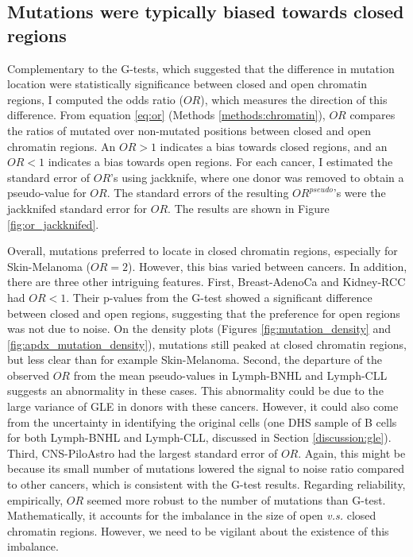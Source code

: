

\subsection{Mutations were typically biased towards closed regions}\label{gle:or}
Complementary to the G-tests, which suggested that the difference in mutation location were statistically significance between closed and open chromatin regions, I computed the odds ratio ($OR$), which measures the direction of this difference. From equation \ref{eq:or} (Methods \ref{methods:chromatin}), $OR$ compares the ratios of mutated over non-mutated positions between closed and open chromatin regions. An $OR>1$ indicates a bias towards closed regions, and an $OR<1$ indicates a bias towards open regions. For each cancer, I estimated the standard error of $OR$'s using jackknife, where one donor was removed to obtain a pseudo-value for $OR$. The standard errors of the resulting $OR^{pseudo}$'s were the jackknifed standard error for $OR$. The results are shown in Figure \ref{fig:or_jackknifed}.



Overall, mutations preferred to locate in closed chromatin regions, especially for Skin-Melanoma ($OR=2$). However, this bias varied between cancers. In addition, there are three other intriguing features. First, Breast-AdenoCa and Kidney-RCC had $OR<1$. Their p-values from the G-test showed a significant difference between closed and open regions, suggesting that the preference for open regions was not due to noise. On the density plots (Figures \ref{fig:mutation_density} and \ref{fig:apdx_mutation_density}), mutations still peaked at closed chromatin regions, but less clear than for example Skin-Melanoma. Second, the departure of the observed $OR$ from the mean pseudo-values in Lymph-BNHL and Lymph-CLL suggests an abnormality in these cases. This abnormality could be due to the large variance of GLE in donors with these cancers. However, it could also come from the uncertainty in identifying the original cells (one DHS sample of B cells for both Lymph-BNHL and Lymph-CLL, discussed in Section \ref{discussion:gle}). Third, CNS-PiloAstro had the largest standard error of $OR$. Again, this might be because its small number of mutations lowered the signal to noise ratio compared to other cancers, which is consistent with the G-test results. Regarding reliability, empirically, $OR$ seemed more robust to the number of mutations than G-test. Mathematically, it accounts for the imbalance in the size of open \textit{v.s.} closed chromatin regions. However, we need to be vigilant about the existence of this imbalance.

